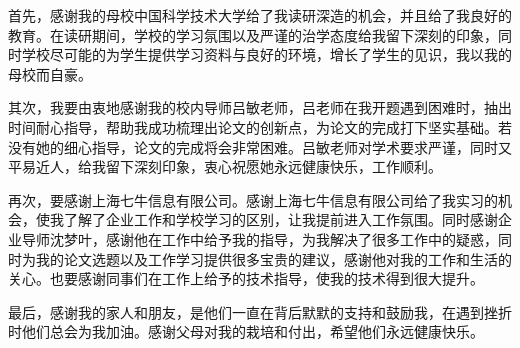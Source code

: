 
\begin{acknowledgements}

    首先，感谢我的母校中国科学技术大学给了我读研深造的机会，并且给了我良好的教育。在读研期间，学校的学习氛围以及严谨的治学态度给我留下深刻的印象，同时学校尽可能的为学生提供学习资料与良好的环境，增长了学生的见识，我以我的母校而自豪。
    
    其次，我要由衷地感谢我的校内导师吕敏老师，吕老师在我开题遇到困难时，抽出时间耐心指导，帮助我成功梳理出论文的创新点，为论文的完成打下坚实基础。若没有她的细心指导，论文的完成将会非常困难。吕敏老师对学术要求严谨，同时又平易近人，给我留下深刻印象，衷心祝愿她永远健康快乐，工作顺利。
    
    再次，要感谢上海七牛信息有限公司。感谢上海七牛信息有限公司给了我实习的机会，使我了解了企业工作和学校学习的区别，让我提前进入工作氛围。同时感谢企业导师沈梦叶，感谢他在工作中给予我的指导，为我解决了很多工作中的疑惑，同时为我的论文选题以及工作学习提供很多宝贵的建议，感谢他对我的工作和生活的关心。也要感谢同事们在工作上给予的技术指导，使我的技术得到很大提升。
    
    最后，感谢我的家人和朋友，是他们一直在背后默默的支持和鼓励我，在遇到挫折时他们总会为我加油。感谢父母对我的栽培和付出，希望他们永远健康快乐。
    
    
    \end{acknowledgements}
    